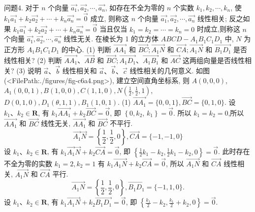问题4. 对于 $n$ 个向量 $\overrightarrow{a_1}, \overrightarrow{a_2}, \cdots, \overrightarrow{a_n}$, 如存在不全为零的 $n$ 个实数 $k_1, k_2, \cdots, k_n$, 使 $k_1 \overrightarrow{a_1}+k_2 \overrightarrow{a_2}+\cdots+k_n \overrightarrow{a_n}=\overrightarrow{0}$ 成立, 则称这 $n$ 个向量 $\overrightarrow{a_1}, \overrightarrow{a_2}, \cdots, \overrightarrow{a_n}$ 线性相关; 反之如果 $k_1 \overrightarrow{a_1}+k_2 \overrightarrow{a_2}+\cdots+k_n \overrightarrow{a_n}=\overrightarrow{0}$ 当且仅当 $k_1=k_2=\cdots= k_n=0$ 时成立,则称这 $n$ 个向量 $\overrightarrow{a_1}, \overrightarrow{a_2}, \cdots, \overrightarrow{a_n}$ 线性无关.
在棱长为 1 的立方体 $A B C D-A_1 B_1 C_1 D_1$ 中, $N$ 为正方形 $A_1 B_1 C_1 D_1$ 的中心.
(1) 判断 $\overrightarrow{A A_1}$ 和 $\overrightarrow{B C} ; \overrightarrow{A_1 N}$ 和 $\overrightarrow{C A} ; \overrightarrow{A_1 N}$ 和 $\overrightarrow{B_1 D_1}$ 是否线性相关?
(2) 判断 $\overrightarrow{A A_1} 、 \overrightarrow{A B}$ 和 $\overrightarrow{B C} ; \overrightarrow{A_1 D_1} 、 \overrightarrow{A_1 B_1}$ 和 $\overrightarrow{A C}$ 这两组向量是否线性相关?
(3) 说明 $\vec{a} 、 \vec{b}$ 线性相关和 $\vec{a} 、 \vec{b} 、 \vec{c}$ 线性相关的几何意义.
如图(<FilePath:./figures/fig-c6a4.png>), 建立空间直角坐标系, 则 $A(0,0,0)$, $A_1(0,0,1), B(1,0,0), C(1,1,0), N\left(\frac{1}{2}, \frac{1}{2}, 1\right)$, $D(0,1,0), D_1(\theta, 1,1), B_1(1,0,1)$.
(1) $\overrightarrow{A A_1}=\{0,0,1\}, \overrightarrow{B C}=\{0,1,0\}$.
设 $k_1 、 k_2 \in \mathbf{R}$, 有 $k_1 \overrightarrow{A A_1}+k_2 \overrightarrow{B C}=\overrightarrow{0}$, 即 $\left\{0, k_2\right.$, $\left.k_1\right\}=\overrightarrow{0}$.
所以 $k_1=k_2=0$,所以 $\overrightarrow{A A_1}$ 和 $\overrightarrow{B C}$ 线性无关, $\overrightarrow{A A_1}$
和 $\overrightarrow{B C}$ 不平行.
$$
\overrightarrow{A_1} \vec{N}=\left\{\frac{1}{2}, \frac{1}{2}, 0\right\}, \overrightarrow{C A}=\{-1,-1,0\}
$$
设 $k_1 、 k_2 \in \mathbf{R}$, 有 $k_1 \overrightarrow{A_1} \vec{N}+k_2 \overrightarrow{C A}=\overrightarrow{0}$, 即 $\left\{\frac{1}{2} k_1-k_2, \frac{1}{2} k_1-k_2, 0\right\}=\overrightarrow{0}$. 此时存在不全为零的实数 $k_1=2, k_2=1$ 有 $k_1 \overrightarrow{A_1 N}+k_2 \overrightarrow{C A}=\overrightarrow{0}$, 所以 $\overrightarrow{A_1 N}$ 和 $\overrightarrow{C A}$ 线性相关, $\overrightarrow{A_1 N}$ 和 $\overrightarrow{C A}$ 平行.
$$
\overrightarrow{A_1 N}=\left\{\frac{1}{2}, \frac{1}{2}, 0\right\}, \overrightarrow{B_1 D_1}=\{-1,1,0\} .
$$
设 $k_1 、 k_2 \in \mathbf{R}$, 有 $k_1 \overrightarrow{A_1 N}+k_2 \overrightarrow{B_1 D_1}=\overrightarrow{0}$, 即 $\left\{\frac{k_1}{2}-k_2, \frac{k_1}{2}+k_2, 0\right\}=\overrightarrow{0}$.
